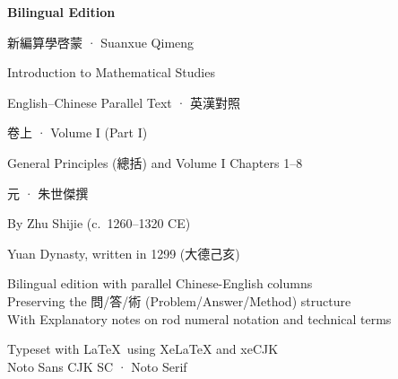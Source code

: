 \documentclass[10pt,a4paper]{article}
\begin{document}
\begin{titlepage}
\begin{center}
\vspace*{1.5cm}

{\fontsize{22}{28}\selectfont\color{titlecolor}
  \textbf{Bilingual Edition}}

\vspace{0.5cm}

{\fontsize{28}{36}\selectfont\color{titlecolor}
  新編算學啓蒙 · Suanxue Qimeng}

\vspace{0.5cm}

{\fontsize{16}{22}\selectfont\color{sectioncolor}
  Introduction to Mathematical Studies}

\vspace{0.3cm}

{\large\color{sectioncolor}
  English--Chinese Parallel Text · 英漢對照}

\vspace{1.5cm}

{\Large\color{titlecolor} 卷上 · Volume I (Part I)}

\vspace{0.3cm}

{\normalsize General Principles (總括) and Volume I Chapters 1--8}

\vspace{2cm}

{\large 元 · 朱世傑撰}

\vspace{0.2cm}

{\normalsize\color{sectioncolor}
  By Zhu Shijie (c.\ 1260--1320 CE)}

\vspace{0.2cm}

{\small\color{sectioncolor}
  Yuan Dynasty, written in 1299 (大德己亥)}

\vspace{2cm}

{\small\color{notecolor}
  Bilingual edition with parallel Chinese-English columns\\
  Preserving the 問/答/術 (Problem/Answer/Method) structure\\
  With Explanatory notes on rod numeral notation and technical terms
}

\vspace{0.5cm}

{\small\color{notecolor}
  Typeset with \LaTeX\ using XeLaTeX and xeCJK\\
  Noto Sans CJK SC · Noto Serif
}

\end{center}
\end{titlepage}
\end{document}
